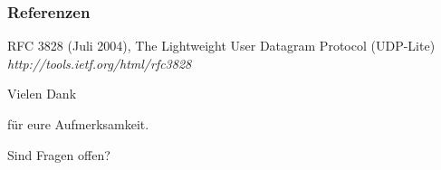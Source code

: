\documentclass{beamer}
\begin{document}

\begin{frame}
\frametitle{Referenzen}
\footnotesize{
\begin{thebibliography}{99} %
 RFC 3828 (Juli 2004), 
\newblock The Lightweight User Datagram Protocol (UDP-Lite)
\newblock \emph{http://tools.ietf.org/html/rfc3828}
\end{thebibliography}
}
\end{frame}


\begin{frame}
\Huge{\centerline{Vielen Dank}}
\Huge{\centerline{für eure Aufmerksamkeit.}}
\Huge{\centerline{}}
\Huge{\centerline{Sind Fragen offen?}}
\end{frame}

\end{document}
